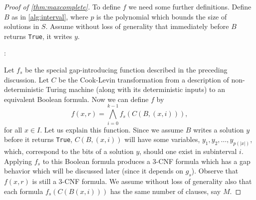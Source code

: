 \documentclass[]{article}
\theoremstyle{plain}
\theoremstyle{definition}
\begin{document}
\begin{proof}[Proof of \autoref{thm:maxcomplete}]
  To define $f$ we need some further definitions.
  Define $B$ as in \autoref{alg:interval}, where $p$ is the polynomial which bounds the size of solutions in $S$.
  Assume without loss of generality that immediately before $B$ returns \texttt{True}, it writes $y$.
  \begin{algorithm}
    \caption{Nondeterministic polynomial time algorithm that decides if there is an approximate solution for instance $x$ of problem $P$ in interval $i$%
      \label{alg:interval}}
    \begin{algorithmic}
      \Statex{}
      :
        \Else
          { }
        \EndIf
      \EndFunction
    \end{algorithmic}
  \end{algorithm}
  Let $f_s$ be the special gap-introducing function described in the preceding discussion.
  Let $C$ be the Cook-Levin transformation from a description of non-deterministic Turing machine (along with its deterministic inputs) to an equivalent Boolean formula.
  Now we can define $f$ by
  \begin{displaymath}
    f(x, r) = \bigwedge_{i = 0}^{k - 1}{f_s(C(B, (x, i)))},
  \end{displaymath}
  for all $x \in I$.
  Let us explain this function.
  Since we assume $B$ writes a solution $y$ before it returns \texttt{True}, $C(B, (x, i))$ will have some variables, $y_1, y_2, \dotsc, y_{p(|x|)}$, which, correspond to the bits of a solution $y$, should one exist in subinterval $i$.
  Applying $f_s$ to this Boolean formula produces a 3-CNF formula which has a gap behavior which will be discussed later (since it depends on $g_s$).
  Observe that $f(x, r)$ is still a 3-CNF formula.
  We assume without loss of generality also that each formula $f_s(C(B(x, i)))$ has the same number of clauses, say $M$.


\end{proof}
\end{document}

